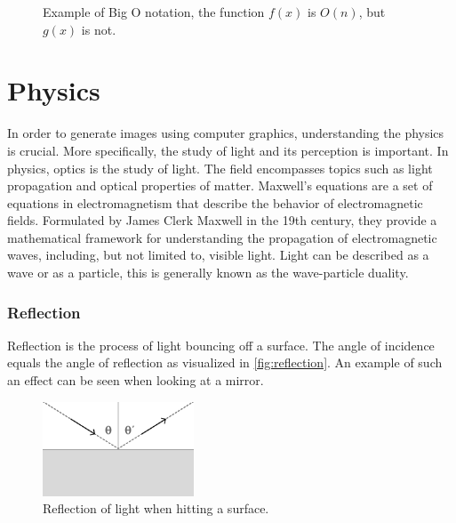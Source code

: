 \begin{figure}[H]
  \centering
  \caption{Example of Big O notation, the function $f(x)$ is $O(n)$, but $g(x)$ is not.}
  \label{fig:bigOVisualization}
\end{figure}

\section{Physics}
\label{ch:physics}

In order to generate images using computer graphics, understanding the physics is crucial. More specifically, the study of light and its perception is important. In physics, optics is the study of light. The field encompasses topics such as light propagation and optical properties of matter. Maxwell's equations are a set of equations in electromagnetism that describe the behavior of electromagnetic fields. Formulated by James Clerk Maxwell in the 19th century, they provide a mathematical framework for understanding the propagation of electromagnetic waves, including, but not limited to, visible light. Light can be described as a wave or as a particle, this is generally known as the wave-particle duality. \cite{fowles1989introduction}

\subsubsection{Reflection}

Reflection is the process of light bouncing off a surface. The angle of incidence equals the angle of reflection as visualized in \autoref{fig:reflection}. An example of such an effect can be seen when looking at a mirror.

\begin{figure}[H]
  \centering
  \includegraphics[width=0.4\textwidth]{resources/reflection.png}
  \caption{Reflection of light when hitting a surface.}
  \label{fig:reflection}
\end{figure}

